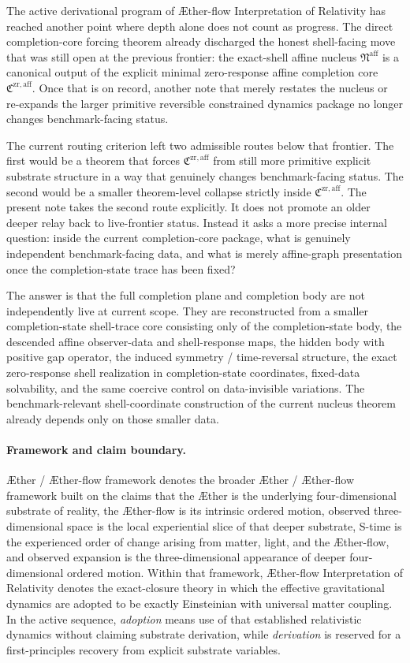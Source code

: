 \documentclass[11pt]{article}
\newcommand{\Aether}{\AE{}ther}
\newcommand{\Aflow}{\AE{}ther-flow}
\newcommand{\TheoryName}{\Aflow{} Interpretation of Relativity}
\newcommand{\TheoryProgram}{\Aether{} / \Aflow{} framework}
\newcommand{\CompletionCore}{\mathfrak C^{\mathrm{zr,aff}}}
\newcommand{\AffineNucleus}{\mathfrak N^{\mathrm{aff}}}
\begin{document}
The active derivational program of \TheoryName{} has reached another point where depth alone does not count as progress. The direct completion-core forcing theorem already discharged the honest shell-facing move that was still open at the previous frontier: the exact-shell affine nucleus \(\AffineNucleus\) is a canonical output of the explicit minimal zero-response affine completion core \(\CompletionCore\). Once that is on record, another note that merely restates the nucleus or re-expands the larger primitive reversible constrained dynamics package no longer changes benchmark-facing status.

The current routing criterion left two admissible routes below that frontier. The first would be a theorem that forces \(\CompletionCore\) from still more primitive explicit substrate structure in a way that genuinely changes benchmark-facing status. The second would be a smaller theorem-level collapse strictly inside \(\CompletionCore\). The present note takes the second route explicitly. It does not promote an older deeper relay back to live-frontier status. Instead it asks a more precise internal question: inside the current completion-core package, what is genuinely independent benchmark-facing data, and what is merely affine-graph presentation once the completion-state trace has been fixed?

The answer is that the full completion plane and completion body are not independently live at current scope. They are reconstructed from a smaller completion-state shell-trace core consisting only of the completion-state body, the descended affine observer-data and shell-response maps, the hidden body with positive gap operator, the induced symmetry / time-reversal structure, the exact zero-response shell realization in completion-state coordinates, fixed-data solvability, and the same coercive control on data-invisible variations. The benchmark-relevant shell-coordinate construction of the current nucleus theorem already depends only on those smaller data.

\paragraph{Framework and claim boundary.}
\TheoryProgram{} denotes the broader \Aether{} / \Aflow{} framework built on the claims that the \Aether{} is the underlying four-dimensional substrate of reality, the \Aflow{} is its intrinsic ordered motion, observed three-dimensional space is the local experiential slice of that deeper substrate, S-time is the experienced order of change arising from matter, light, and the \Aflow{}, and observed expansion is the three-dimensional appearance of deeper four-dimensional ordered motion. Within that framework, \TheoryName{} denotes the exact-closure theory in which the effective gravitational dynamics are adopted to be exactly Einsteinian with universal matter coupling. In the active sequence, \emph{adoption} means use of that established relativistic dynamics without claiming substrate derivation, while \emph{derivation} is reserved for a first-principles recovery from explicit substrate variables.
\end{document}
